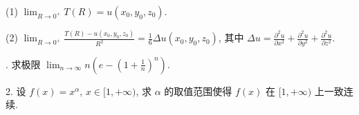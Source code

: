 \documentclass{examcollection}
\begin{document}
{\begin{minipage}{\textwidth}
(1) $\lim_{R\to 0^{+}}T(R) = u(x_0,y_0,z_0)$.\par
(2) $\lim_{R\to 0^{+}}\frac{T(R) - u(x_0,y_0,z_0)}{R^2} = \frac{1}{6}\Delta u(x_0,y_0,z_0)$, 其中 $\Delta u = \frac{\partial^2u}{\partial x^2} +\frac{\partial^2u}{\partial y^2} +\frac{\partial^2u}{\partial z^2}.$\par
{}. 求极限 $\lim_{n\to \infty}n\left(e - \left(1 + \frac{1}{n}\right)^n\right)$.\par
2. 设 $f(x) = x^{\alpha}$, $x \in [1, +\infty)$, 求 $\alpha$ 的取值范围使得 $f(x)$ 在 $[1, +\infty)$ 上一致连续.\par
\end{minipage}}
\ifdim\dimexpr\ht\proofbox+\dp\proofbox\relax>\textheight
\noindent\resizebox{!}{\textheight}{\usebox{\proofbox}}\else\noindent\usebox{\proofbox}\fi\clearpage
\end{document}
